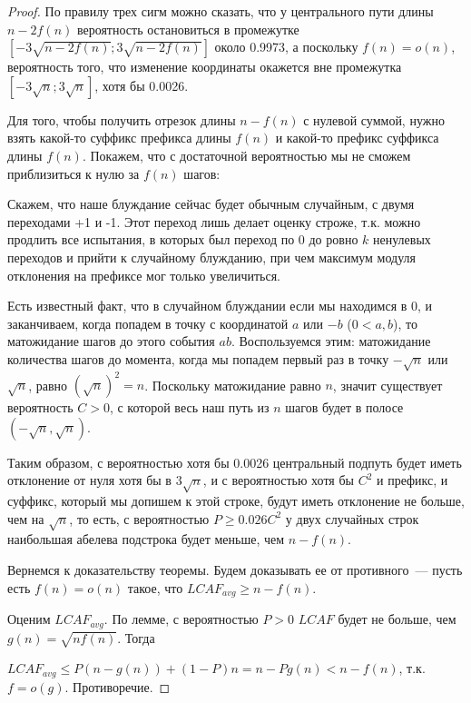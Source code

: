\begin{proof}
По правилу трех сигм можно сказать, что у центрального пути длины $n-2f(n)$ вероятность остановиться в промежутке $[-3\sqrt{n-2f(n)}; 3\sqrt{n-2f(n)}]$ около 0.9973, а поскольку $f(n)=o(n)$, вероятность того, что изменение координаты окажется вне промежутка $[-3\sqrt{n}; 3\sqrt{n}]$, хотя бы 0.0026. %

Для того, чтобы получить отрезок длины $n-f(n)$ с нулевой суммой, нужно взять какой-то суффикс префикса длины $f(n)$ и какой-то префикс суффикса длины $f(n)$. Покажем, что с достаточной вероятностью мы не сможем приблизиться к нулю за $f(n)$ шагов:

Скажем, что наше блуждание сейчас будет обычным случайным, с двумя переходами +1 и -1. Этот переход лишь делает оценку строже, т.к. можно продлить все испытания, в которых был переход по 0 до ровно $k$ ненулевых переходов и прийти к случайному блужданию, при чем максимум модуля отклонения на префиксе мог только увеличиться.

Есть известный факт, что в случайном блуждании если мы находимся в 0, и заканчиваем, когда попадем в точку с координатой $a$ или $-b$ ($0 < a, b$), то матожидание шагов до этого события $ab$. Воспользуемся этим: матожидание количества шагов до момента, когда мы попадем первый раз в точку $-\sqrt n$ или $\sqrt n$, равно $(\sqrt n)^2=n$. Поскольку матожидание равно $n$, значит существует вероятность $C>0$, с которой весь наш путь из $n$ шагов будет в полосе $(-\sqrt n, \sqrt n)$. %

Таким образом, с вероятностью хотя бы 0.0026 центральный подпуть будет иметь отклонение от нуля хотя бы в $3\sqrt n$, и с вероятностью хотя бы $C^2$ и префикс, и суффикс, который мы допишем к этой строке, будут иметь отклонение не больше, чем на $\sqrt n$, то есть, с вероятностью $P \ge 0.026C^2$ у двух случайных строк наибольшая абелева подстрока будет меньше, чем $n-f(n)$.

Вернемся к доказательству теоремы. Будем доказывать ее от противного~--- пусть есть $f(n)=o(n)$ такое, что $LCAF_{avg} \ge n - f(n)$. 

Оценим $LCAF_{avg}$. По лемме, с вероятностью $P>0$ $LCAF$ будет не больше, чем $g(n)=\sqrt{nf(n)}$. Тогда

$LCAF_{avg} \le P (n-g(n)) + (1-P)n = n-Pg(n) < n - f(n)$, т.к. $f=o(g)$. Противоречие.

\end{proof}

